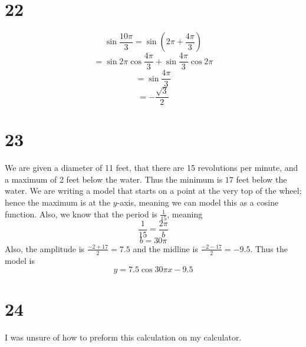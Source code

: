 \documentclass{article}
\theoremstyle{definition}
\newcommand{\?}{\stackrel{?}{=}}
\begin{document}
\section*{22}
\[ \sin\frac{10\pi}{3}=\sin(2\pi+\frac{4\pi}{3}) \]
\[ =\sin 2\pi\cos\frac{4\pi}{3}+\sin\frac{4\pi}{3}\cos 2\pi \]
\[ =\sin\frac{4\pi}{3} \]
\[ =-\frac{\sqrt{3}}{2} \]

\section*{23}
We are given a diameter of 11 feet, that there are 15 revolutions per minute, and a maximum of 2 feet below the water. Thus the minimum is $17$ feet below the water. We are writing a model that starts on a point 
at the very top of the wheel; hence the maximum is at the $y$-axis, meaning we can model this as a cosine function. Also, we know that the period is $\frac{1}{15}$, meaning
\[ \frac{1}{15}=\frac{2\pi}{b} \] \[ b=30\pi \] Also, the amplitude is $\frac{-2+17}{2}=7.5$ and the midline is $\frac{-2-17}{2}=-9.5$.
Thus the model is
\[ y=7.5\cos 30\pi x-9.5 \]

\section*{24}
I was unsure of how to preform this calculation on my calculator.
\end{document}
